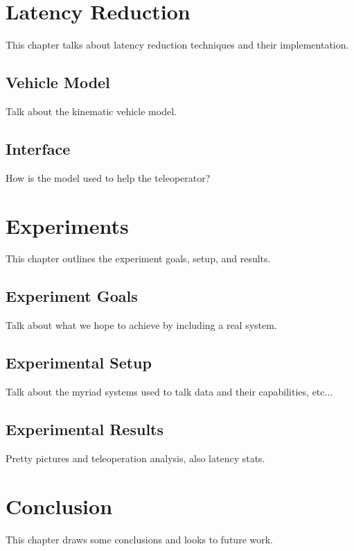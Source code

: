 \documentclass[12pt]{report}
\begin{document}

\chapter{Latency Reduction}\label{chap:latency_reduction}
This chapter talks about latency reduction techniques and their implementation.

\section{Vehicle Model}
Talk about the kinematic vehicle model.

\section{Interface}
How is the model used to help the teleoperator?


\chapter{Experiments}\label{chap:experiments}
This chapter outlines the experiment goals, setup, and results.

\section{Experiment Goals}
Talk about what we hope to achieve by including a real system.

\section{Experimental Setup}
Talk about the myriad systems used to talk data and their capabilities, etc...

\section{Experimental Results}
Pretty pictures and teleoperation analysis, also latency stats.


\chapter{Conclusion}\label{chap:conclusion}
This chapter draws some conclusions and looks to future work.
\end{document}
